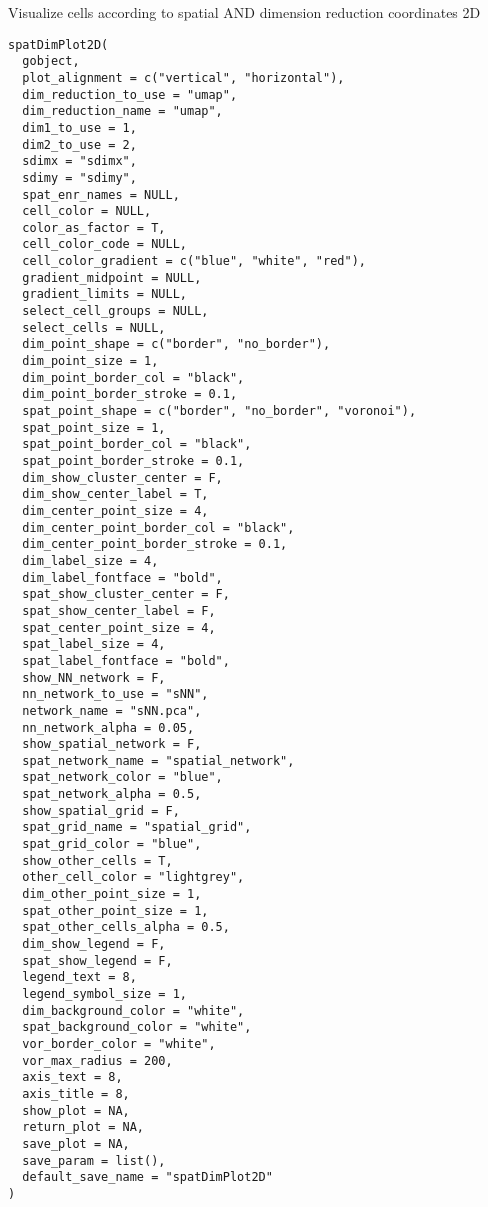 \documentclass[a4paper]{book}
\begin{document}
%
\begin{Description}\relax
Visualize cells according to spatial AND dimension reduction coordinates 2D
\end{Description}
%
\begin{Usage}
\begin{verbatim}
spatDimPlot2D(
  gobject,
  plot_alignment = c("vertical", "horizontal"),
  dim_reduction_to_use = "umap",
  dim_reduction_name = "umap",
  dim1_to_use = 1,
  dim2_to_use = 2,
  sdimx = "sdimx",
  sdimy = "sdimy",
  spat_enr_names = NULL,
  cell_color = NULL,
  color_as_factor = T,
  cell_color_code = NULL,
  cell_color_gradient = c("blue", "white", "red"),
  gradient_midpoint = NULL,
  gradient_limits = NULL,
  select_cell_groups = NULL,
  select_cells = NULL,
  dim_point_shape = c("border", "no_border"),
  dim_point_size = 1,
  dim_point_border_col = "black",
  dim_point_border_stroke = 0.1,
  spat_point_shape = c("border", "no_border", "voronoi"),
  spat_point_size = 1,
  spat_point_border_col = "black",
  spat_point_border_stroke = 0.1,
  dim_show_cluster_center = F,
  dim_show_center_label = T,
  dim_center_point_size = 4,
  dim_center_point_border_col = "black",
  dim_center_point_border_stroke = 0.1,
  dim_label_size = 4,
  dim_label_fontface = "bold",
  spat_show_cluster_center = F,
  spat_show_center_label = F,
  spat_center_point_size = 4,
  spat_label_size = 4,
  spat_label_fontface = "bold",
  show_NN_network = F,
  nn_network_to_use = "sNN",
  network_name = "sNN.pca",
  nn_network_alpha = 0.05,
  show_spatial_network = F,
  spat_network_name = "spatial_network",
  spat_network_color = "blue",
  spat_network_alpha = 0.5,
  show_spatial_grid = F,
  spat_grid_name = "spatial_grid",
  spat_grid_color = "blue",
  show_other_cells = T,
  other_cell_color = "lightgrey",
  dim_other_point_size = 1,
  spat_other_point_size = 1,
  spat_other_cells_alpha = 0.5,
  dim_show_legend = F,
  spat_show_legend = F,
  legend_text = 8,
  legend_symbol_size = 1,
  dim_background_color = "white",
  spat_background_color = "white",
  vor_border_color = "white",
  vor_max_radius = 200,
  axis_text = 8,
  axis_title = 8,
  show_plot = NA,
  return_plot = NA,
  save_plot = NA,
  save_param = list(),
  default_save_name = "spatDimPlot2D"
)
\end{verbatim}
\end{Usage}
%
\end{document}
